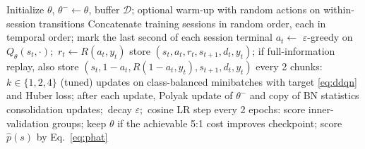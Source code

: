 \begin{algorithm}[t]
\caption{E-DDQN training for one inner split}
\label{alg:eddqn}
\begin{algorithmic}[1]
\small
\State Initialize $\theta$, $\theta^-\!\leftarrow\theta$, buffer $\mathcal{D}$; optional warm-up with random actions on within-session transitions
  \State Concatenate training sessions in random order, each in temporal order; mark the last second of each session terminal
    \State $a_t\gets$ $\varepsilon$-greedy on $Q_\theta(s_t,\cdot)$;\ $r_t\gets R(a_t,y_t)$
    \State store $(s_t,a_t,r_t,s_{t+1},d_t,y_t)$; if full-information replay, also store $(s_t,1-a_t,R(1-a_t,y_t),s_{t+1},d_t,y_t)$
    \State every 2 chunks: $k\in\{1,2,4\}$ (tuned) updates on class-balanced minibatches with target \eqref{eq:ddqn} and Huber loss; after each update, Polyak update of $\theta^-$ and copy of BN statistics
  \EndFor
   consolidation updates;\ decay $\varepsilon$;\ cosine LR step
  \State every 2 epochs: score inner-validation groups; keep $\theta$ if the achievable 5:1 cost improves
\EndFor
\State \Return checkpoint; score $\hat p(s)$ by Eq.~\eqref{eq:phat}
\end{algorithmic}
\end{algorithm}


